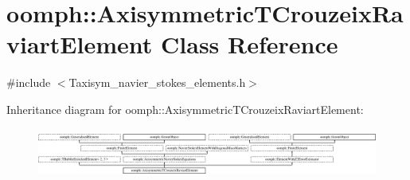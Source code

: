 \hypertarget{classoomph_1_1AxisymmetricTCrouzeixRaviartElement}{}\section{oomph\+:\+:Axisymmetric\+T\+Crouzeix\+Raviart\+Element Class Reference}
\label{classoomph_1_1AxisymmetricTCrouzeixRaviartElement}


{\ttfamily \#include $<$Taxisym\+\_\+navier\+\_\+stokes\+\_\+elements.\+h$>$}

Inheritance diagram for oomph\+:\+:Axisymmetric\+T\+Crouzeix\+Raviart\+Element\+:\begin{figure}[H]
\begin{center}
\leavevmode
\includegraphics[height=1.671642cm]{classoomph_1_1AxisymmetricTCrouzeixRaviartElement}
\end{center}
\end{figure}
